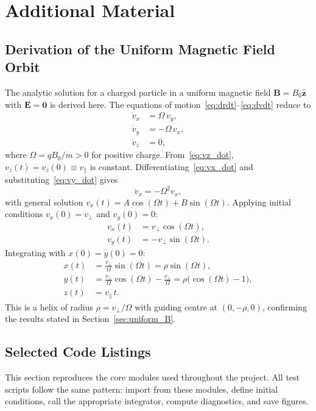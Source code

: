 \appendix
\chapter{Additional Material}
\label{app:additional}

\section{Derivation of the Uniform Magnetic Field Orbit}
\label{sec:derivation}
The analytic solution for a charged particle in a uniform magnetic field
$\mathbf{B} = B_0\hat{\mathbf{z}}$ with $\mathbf{E} = \mathbf{0}$ is
derived here. The equations of motion~\eqref{eq:drdt}--\eqref{eq:dvdt}
reduce to
\begin{align}
  \dot{v}_x &= \Omega\,v_y, \label{eq:vx_dot} \\
  \dot{v}_y &= -\Omega\,v_x, \label{eq:vy_dot} \\
  \dot{v}_z &= 0, \label{eq:vz_dot}
\end{align}
where $\Omega = qB_0/m > 0$ for positive charge. From~\eqref{eq:vz_dot},
$v_z(t) = v_z(0) \equiv v_\parallel$ is constant.
Differentiating~\eqref{eq:vx_dot} and substituting~\eqref{eq:vy_dot}
gives
\begin{equation}
  \ddot{v}_x = -\Omega^2 v_x,
  \label{eq:sho}
\end{equation}
with general solution $v_x(t) = A\cos(\Omega t) + B\sin(\Omega t)$.
Applying initial conditions $v_x(0) = v_\perp$ and $v_y(0) = 0$:
\begin{align}
  v_x(t) &= v_\perp \cos(\Omega t), \label{eq:vx_sol} \\
  v_y(t) &= -v_\perp \sin(\Omega t). \label{eq:vy_sol}
\end{align}
Integrating with $x(0) = y(0) = 0$:
\begin{align}
  x(t) &= \frac{v_\perp}{\Omega}\sin(\Omega t)
    = \rho\sin(\Omega t), \label{eq:x_sol} \\
  y(t) &= \frac{v_\perp}{\Omega}\cos(\Omega t)
    - \frac{v_\perp}{\Omega}
    = \rho\bigl(\cos(\Omega t) - 1\bigr), \label{eq:y_sol} \\
  z(t) &= v_\parallel\,t. \label{eq:z_sol}
\end{align}
This is a helix of radius $\rho = v_\perp/\Omega$ with guiding centre
at $(0, -\rho, 0)$, confirming the results stated in
Section~\ref{sec:uniform_B}.

\section{Selected Code Listings}
\label{sec:code_listings}
This section reproduces the core modules used throughout the project. All
test scripts follow the same pattern: import from these modules, define
initial conditions, call the appropriate integrator, compute diagnostics,
and save figures.

